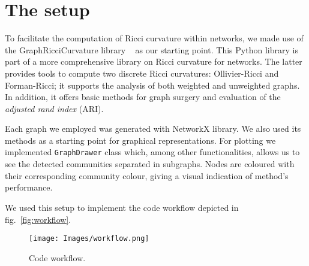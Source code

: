 \section{The setup}\label{sec5.1}
To facilitate the computation of Ricci curvature within networks, we made use of the GraphRicciCurvature library ~\cite{Ollivier-RicciLib} as our starting point. This Python library is part of a more comprehensive library on Ricci curvature for networks. The latter provides tools to compute two discrete Ricci curvatures: Ollivier-Ricci and Forman-Ricci; it supports the analysis of both weighted and unweighted graphs. In addition, it offers basic methods for graph surgery and evaluation of the \textit{adjusted rand index} (ARI).

Each graph we employed was generated with NetworkX library. We also used its methods as a starting point for graphical representations.
For plotting we implemented \texttt{GraphDrawer} class which, among other functionalities, allows us to see the detected communities separated in subgraphs. Nodes are coloured with their corresponding community colour, giving a visual indication of method's performance. 

We used this setup to implement the code workflow depicted in fig.~\ref{fig:workflow}.

\begin{figure}
    \centering
    \texttt{[image: Images/workflow.png]}
    \caption{Code workflow.}
\end{figure}\label{fig:workflow}
